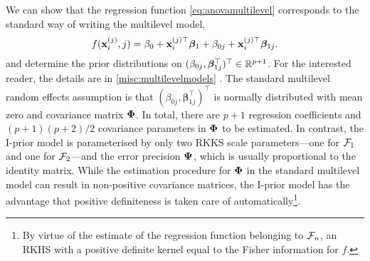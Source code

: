 We can show that the regression function \cref{eq:anovamultilevel} corresponds to the standard way of writing the multilevel model, 
\begin{equation}\label{eq:standmultilevel}
  f({\mathbf x}_i^{(j)}, j) = \beta_0 + {\mathbf x}_i^{(j)\top}\boldsymbol{\beta}_1 + \beta_{0j} + {\mathbf x}_i^{(j)\top}\boldsymbol{\beta}_{1j}.   
\end{equation}
and determine the prior distributions on $(\beta_{0j},\boldsymbol{\beta}_{1j}^\top)^\top \in \mathbb{R}^{p+1}$.
For the interested reader, the details are in \cref{misc:multilevelmodels} .
The standard multilevel random effects assumption is that $(\beta_{0j},\boldsymbol{\beta}_{1j}^\top)^\top$ is normally distributed with mean zero and covariance matrix ${\bm\Phi}$.
In total, there are $p+1$ regression coefficients and $(p+1)(p+2)/2$ covariance parameters in ${\bm\Phi}$ to be estimated.
In contrast, the I-prior model is parameterised by only two RKKS scale parameters---one for ${\mathcal F}_1$ and one for ${\mathcal F}_2$---and the error precision ${\bm\Psi}$, which is usually proportional to the identity matrix.
While the estimation procedure for ${\bm\Phi}$ in the standard multilevel model can result in non-positive covariance matrices, the I-prior model has the advantage that positive definiteness is taken care of automatically\footnote{By virtue of the estimate of the regression function belonging to ${\mathcal F}_n$, an RKHS with a positive definite kernel equal to the Fisher information for $f$.}.

